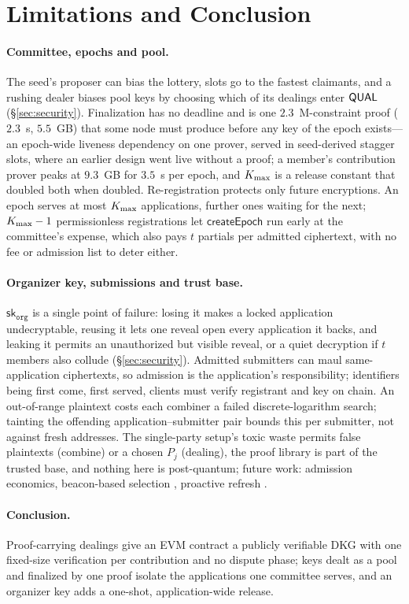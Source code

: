 \section{Limitations and Conclusion}
\label{sec:limits}

\paragraph{Committee, epochs and pool.} The seed's proposer can bias the lottery, slots go to the fastest claimants, and a rushing dealer biases pool keys by choosing which of its dealings enter $\mathsf{QUAL}$ (\S\ref{sec:security}). Finalization has no deadline and is one $2.3$~M-constraint proof ($2.3$~s, $5.5$~GB) that some node must produce before any key of the epoch exists---an epoch-wide liveness dependency on one prover, served in seed-derived stagger slots, where an earlier design went live without a proof; a member's contribution prover peaks at $9.3$~GB for $3.5$~s per epoch, and $K_{\max}$ is a release constant that doubled both when doubled. Re-registration protects only future encryptions. An epoch serves at most $K_{\max}$ applications, further ones waiting for the next; $K_{\max} - 1$ permissionless registrations let $\mathsf{createEpoch}$ run early at the committee's expense, which also pays $t$ partials per admitted ciphertext, with no fee or admission list to deter either.

\paragraph{Organizer key, submissions and trust base.} $\mathsf{sk}_{\mathtt{org}}$ is a single point of failure: losing it makes a locked application undecryptable, reusing it lets one reveal open every application it backs, and leaking it permits an unauthorized but visible reveal, or a quiet decryption if $t$ members also collude (\S\ref{sec:security}). Admitted submitters can maul same-application ciphertexts, so admission is the application's responsibility; identifiers being first come, first served, clients must verify registrant and key on chain. An out-of-range plaintext costs each combiner a failed discrete-logarithm search; tainting the offending application--submitter pair bounds this per submitter, not against fresh addresses. The single-party setup's toxic waste permits false plaintexts (combine) or a chosen $P_j$ (dealing), the proof library is part of the trusted base, and nothing here is post-quantum; future work: admission economics, beacon-based selection \cite{micali1999vrf,drand2024}, proactive refresh \cite{herzberg1995proactive}.

\paragraph{Conclusion.} Proof-carrying dealings give an EVM contract a publicly verifiable DKG with one fixed-size verification per contribution and no dispute phase; keys dealt as a pool and finalized by one proof isolate the applications one committee serves, and an organizer key adds a one-shot, application-wide release.
